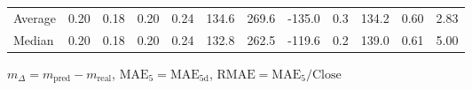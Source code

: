 \begin{threeparttable}
{\begin{tabular}{lrrrrrrrrrrr}
Average &          0.20 &          0.18 &          0.20 &        0.24 &               134.6 &               269.6 &     -135.0 &                 0.3 &            134.2 &            0.60 &                   2.83 \\
 Median &          0.20 &          0.18 &          0.20 &        0.24 &               132.8 &               262.5 &     -119.6 &                 0.2 &            139.0 &            0.61 &                   5.00 \\
\bottomrule
\end{tabular}
}
\begin{tablenotes}\footnotesize
\item $m_\Delta=m_{\text{pred}}-m_{\text{real}}$,
$\mathrm{MAE}_5=\mathrm{MAE}_{5\text{d}}$,
$\mathrm{RMAE}=\mathrm{MAE}_5/\text{Close}$
\end{tablenotes}
\end{threeparttable}
\endgroup


